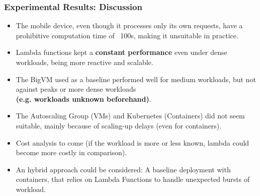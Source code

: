 \documentclass[pdf,10pt]{beamer}
\begin{document}
\begin{frame}\frametitle{Experimental Results: Discussion}


\begin{itemize}
\item The mobile device, even though it processes only its own requests, have a prohibitive computation time of ~100s, making it unsuitable in practice.
\item Lambda functions kept a \textbf{constant performance} even under dense workloads, being more reactive and scalable.
\item The BigVM used as a baseline performed well for medium workloads, but not against peaks or more dense workloads \\ \textbf{(e.g. workloads unknown beforehand)}.
\item The Autoscaling Group (VMs) and Kubernetes (Containers) did not seem suitable, mainly because of scaling-up delays (even for containers).
\item Cost analysis to come (if the workload is more or less known, lambda could become more costly in comparison).
\item An hybrid approach could be considered: A baseline deployment with containers, that relies on Lambda Functions to handle unexpected bursts of workload.
\end{itemize}
\end{frame}




\end{document}
